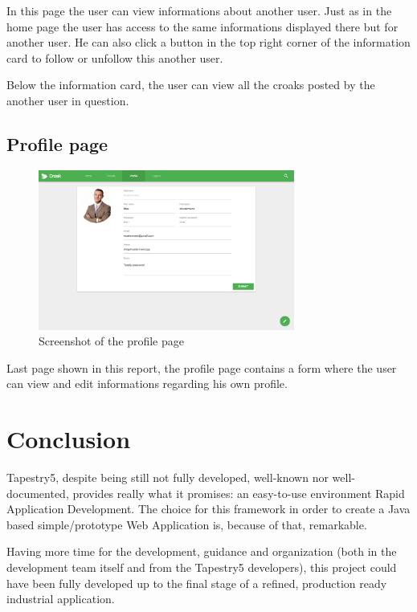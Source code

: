\documentclass[paper=a4, fontsize=12pt]{scrartcl}
\numberwithin{equation}{section}    %
\numberwithin{figure}{section}      %
\numberwithin{table}{section}        %
\begin{document}
In this page the user can view informations about another user. Just as in the home page
the user has access to the same informations displayed there but for another user.
He can also click a button in the top right corner of the information card to follow or unfollow
this another user.

Below the information card, the user can view all the croaks posted by the another user in question.

\subsection{Profile page}
\begin{figure}[H]
  \begin{center}
    \includegraphics[width=0.75\textwidth]{screenshots/profile}
  \end{center}
  \caption{Screenshot of the profile page}
\end{figure}

Last page shown in this report, the profile page contains a form where the user
can view and edit informations regarding his own profile.

\pagebreak
\section{Conclusion}
Tapestry5, despite being still not fully developed, well-known nor well-documented,
provides really what it promises: an easy-to-use environment Rapid Application Development.
The choice for this framework in order to create a Java based simple/prototype Web Application
is, because of that, remarkable.

Having more time for the development, guidance and organization (both in the development
team itself and from the Tapestry5 developers), this project could have been fully
developed up to the final stage of a refined, production ready industrial application.
\end{document}
